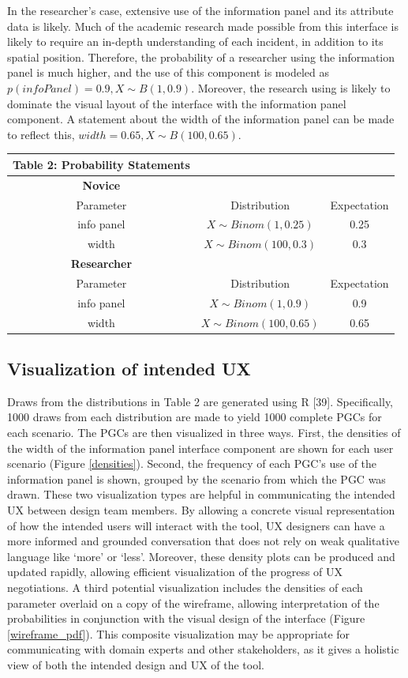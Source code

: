 \documentclass[]{article}
\begin{document}
In the researcher's case, extensive use of the information panel and its
attribute data is likely. Much of the academic research made possible
from this interface is likely to require an in-depth understanding of
each incident, in addition to its spatial position. Therefore, the
probability of a researcher using the information panel is much higher,
and the use of this component is modeled as
\(p(infoPanel) = 0.9, X \sim B(1, 0.9)\). Moreover, the research using
is likely to dominate the visual layout of the interface with the
information panel component. A statement about the width of the
information panel can be made to reflect this,
\(width=0.65, X \sim B(100, 0.65)\).

\begin{longtable}[]{@{}ccc@{}}
\toprule
Table 2: Probability Statements & &\tabularnewline
\midrule
\endhead
\textbf{Novice} & &\tabularnewline
Parameter & Distribution & Expectation\tabularnewline
info panel & \(X \sim Binom(1, 0.25)\) & 0.25\tabularnewline
width & \(X \sim Binom(100, 0.3)\) & 0.3\tabularnewline
\textbf{Researcher} & &\tabularnewline
Parameter & Distribution & Expectation\tabularnewline
info panel & \(X \sim Binom(1, 0.9)\) & 0.9\tabularnewline
width & \(X \sim Binom(100, 0.65)\) & 0.65\tabularnewline
\bottomrule
\end{longtable}

\subsection{Visualization of intended
UX}\label{visualization-of-intended-ux}

Draws from the distributions in Table 2 are generated using R {[}39{]}.
Specifically, 1000 draws from each distribution are made to yield 1000
complete PGCs for each scenario. The PGCs are then visualized in three
ways. First, the densities of the width of the information panel
interface component are shown for each user scenario (Figure
\ref{densities}). Second, the frequency of each PGC's use of the
information panel is shown, grouped by the scenario from which the PGC
was drawn. These two visualization types are helpful in communicating
the intended UX between design team members. By allowing a concrete
visual representation of how the intended users will interact with the
tool, UX designers can have a more informed and grounded conversation
that does not rely on weak qualitative language like `more' or `less'.
Moreover, these density plots can be produced and updated rapidly,
allowing efficient visualization of the progress of UX negotiations. A
third potential visualization includes the densities of each parameter
overlaid on a copy of the wireframe, allowing interpretation of the
probabilities in conjunction with the visual design of the interface
(Figure \ref{wireframe_pdf}). This composite visualization may be
appropriate for communicating with domain experts and other
stakeholders, as it gives a holistic view of both the intended design
and UX of the tool.
\end{document}
